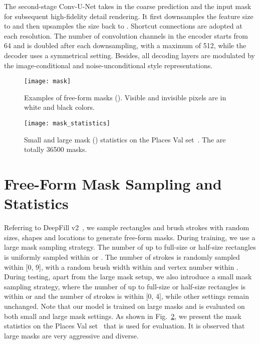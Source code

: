 \documentclass[10pt,twocolumn,letterpaper]{article}
\begin{document}
	The second-stage Conv-U-Net takes in the coarse prediction and the input mask for subsequent high-fidelity detail rendering. It first downsamples the feature size to  and then upsamples the size back to . Shortcut connections are adopted at each resolution. The number of convolution channels in the encoder starts from 64 and is doubled after each downsampling, with a maximum of 512, while the decoder uses a symmetrical setting. Besides, all decoding layers are modulated by the image-conditional and noise-unconditional style representations.
	
	\begin{figure}[t]
		\begin{center}
			\texttt{[image: mask]}
		\end{center}
		\vspace{-0.1in}
		\caption{Examples of free-form masks (). Visible and invisible pixels are in white and black colors.}
		\label{fig:mask}
	\end{figure}
	
	\begin{figure}[t]
		\begin{center}
			\texttt{[image: mask\_statistics]}
		\end{center}
		\vspace{-0.15in}
		\caption{Small and large mask () statistics on the Places Val set~\cite{zhou2017places}. The are totally 36500 masks.}
		\label{fig:statistics}
		\vspace{-0.2in}
	\end{figure}
	
	\section{Free-Form Mask Sampling and Statistics}
	\label{sec:mask}
	
	Referring to DeepFill v2~\cite{yu2019free}, we sample rectangles and brush strokes with random sizes, shapes and locations to generate free-form masks. During training, we use a large mask sampling strategy. The number of up to full-size or half-size rectangles is uniformly sampled within  or . The number of strokes is randomly sampled within [0, 9], with a random brush width within  and vertex number within . During testing, apart from the large mask setup, we also introduce a small mask sampling strategy, where the number of up to full-size or half-size rectangles is within  or  and the number of strokes is within [0, 4], while other settings remain unchanged. Note that our model is trained on large masks and is evaluated on both small and large mask settings. As shown in Fig.~\ref{fig:statistics}, we present the mask statistics on the Places Val set~\cite{zhou2017places} that is used for evaluation. It is observed that large masks are very aggressive and diverse.
	
\end{document}
